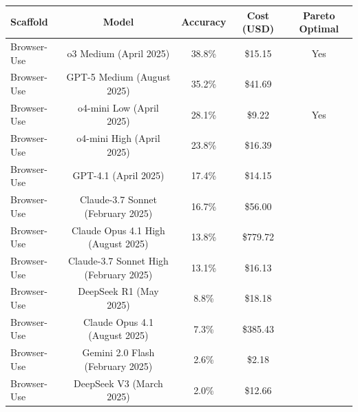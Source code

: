 \begin{tabular}{lcccc}
\toprule
Scaffold & Model & Accuracy & Cost (USD) & Pareto Optimal \\
\midrule
Browser-Use & o3 Medium (April 2025) & 38.8\% & \$15.15 & Yes \\
Browser-Use & GPT-5 Medium (August 2025) & 35.2\% & \$41.69 &  \\
Browser-Use & o4-mini Low (April 2025) & 28.1\% & \$9.22 & Yes \\
Browser-Use & o4-mini High (April 2025) & 23.8\% & \$16.39 &  \\
Browser-Use & GPT-4.1 (April 2025) & 17.4\% & \$14.15 &  \\
Browser-Use & Claude-3.7 Sonnet (February 2025) & 16.7\% & \$56.00 &  \\
Browser-Use & Claude Opus 4.1 High (August 2025) & 13.8\% & \$779.72 &  \\
Browser-Use & Claude-3.7 Sonnet High (February 2025) & 13.1\% & \$16.13 &  \\
Browser-Use & DeepSeek R1 (May 2025) & 8.8\% & \$18.18 &  \\
Browser-Use & Claude Opus 4.1 (August 2025) & 7.3\% & \$385.43 &  \\
Browser-Use & Gemini 2.0 Flash (February 2025) & 2.6\% & \$2.18 &  \\
Browser-Use & DeepSeek V3 (March 2025) & 2.0\% & \$12.66 &  \\
\bottomrule
\end{tabular}